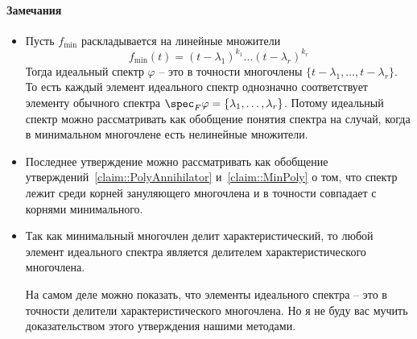 \paragraph{Замечания}
\begin{itemize}
\item Пусть $f_{\text{min}}$ раскладывается на линейные множители
\[
f_{\text{min}}(t) = (t - \lambda_1)^{k_1}\ldots(t-\lambda_r)^{k_r}
\]
Тогда идеальный спектр $\varphi$ -- это в точности многочлены $\{t-\lambda_1,\ldots,t-\lambda_r\}$.
То есть каждый элемент идеального спектр однозначно соответствует элементу обычного спектра $\spec_F\varphi = \{\lambda_1,\ldots,\lambda_r\}$.
Потому идеальный спектр можно рассматривать как обобщение понятия спектра на случай, когда в минимальном многочлене есть нелинейные множители.

\item Последнее утверждение можно рассматривать как обобщение утверждений~\ref{claim::PolyAnnihilator} и~\ref{claim::MinPoly} о том, что спектр лежит среди корней зануляющего многочлена и в точности совпадает с корнями минимального.

\item Так как минимальный многочлен делит характеристический, то любой элемент идеального спектра является делителем характеристического многочлена.

На самом деле можно показать, что элементы идеального спектра -- это в точности делители характеристического многочлена.
Но я не буду вас мучить доказательством этого утверждения нашими методами.


\end{itemize}

